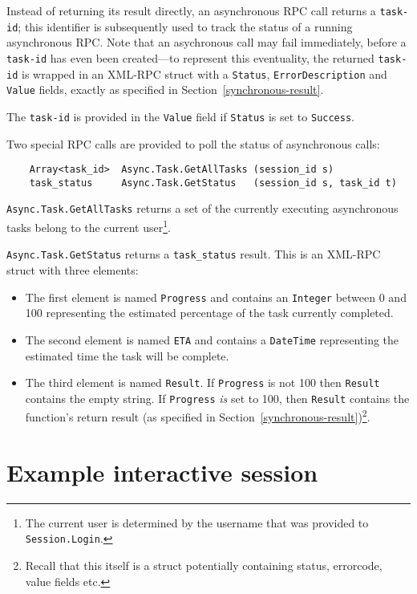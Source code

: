 Instead of returning its result directly, an asynchronous RPC call
returns a {\tt task-id}; this identifier is subsequently used
to track the status of a running asynchronous RPC. Note that an asychronous
call may fail immediately, before a {\tt task-id} has even been created---to
represent this eventuality, the returned {\tt task-id}
is wrapped in an XML-RPC struct with a {\tt Status}, {\tt ErrorDescription} and
{\tt Value} fields, exactly as specified in Section~\ref{synchronous-result}.

The {\tt task-id} is provided in the {\tt Value} field if {\tt Status} is set to
{\tt Success}.

Two special RPC calls are provided to poll the status of
asynchronous calls:
\begin{verbatim}
    Array<task_id>  Async.Task.GetAllTasks (session_id s)
    task_status     Async.Task.GetStatus   (session_id s, task_id t)
\end{verbatim}

{\tt Async.Task.GetAllTasks} returns a set of the currently
executing asynchronous tasks belong to the current user\footnote{
%
The current user is determined by the username that was provided
to {\tt Session.Login}.
%
}.

{\tt Async.Task.GetStatus} returns a {\tt task\_status} result.
This is an XML-RPC struct with three elements:
\begin{itemize}
  \item The first element is named {\tt Progress} and contains
an {\tt Integer} between 0 and 100 representing the estimated percentage of
the task currently completed.
  \item The second element is named {\tt ETA} and contains a {\tt DateTime} 
representing the estimated time the task will be complete.
  \item The third element is named {\tt Result}. If {\tt Progress}
is not 100 then {\tt Result} contains the empty string. If {\tt Progress}
{\em is\/} set to 100, then {\tt Result} contains the function's return
result (as specified in Section~\ref{synchronous-result})\footnote{
%
Recall that this itself is a struct potentially containing status, errorcode,
value fields etc.
%
}.
\end{itemize}

\section{Example interactive session}

